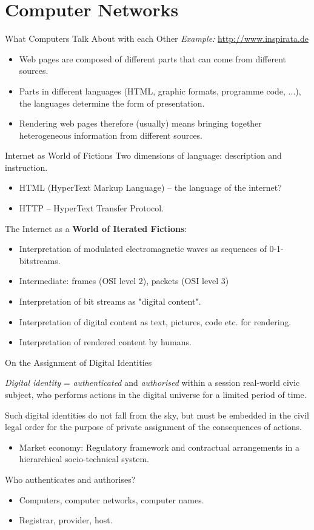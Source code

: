 \documentclass{beamer}
\begin{document}
\section{Computer Networks}
\begin{frame}{What Computers Talk About with each Other}
\emph{Example:} \url{http://www.inspirata.de} 
\begin{itemize}
\item Web pages are composed of different parts that can come from different
  sources.
\item Parts in different languages (HTML, graphic formats, programme code,
  ...), the languages determine the form of presentation.
\item Rendering web pages therefore (usually) means bringing together
  heterogeneous information from different sources.
\end{itemize}
\end{frame}
\begin{frame}{Internet as World of Fictions}
Two dimensions of language: description and instruction.
\begin{itemize}
\item HTML (HyperText Markup Language) -- the language of the internet? 
\item HTTP -- HyperText Transfer Protocol.
\end{itemize}
The Internet as a \textbf{World of Iterated Fictions}: 
\begin{itemize}
\item Interpretation of modulated electromagnetic waves as sequences of
  0-1-bitstreams. 
\item Intermediate: frames (OSI level 2), packets (OSI level 3)
\item Interpretation of bit streams as "digital content".
\item Interpretation of digital content as text, pictures, code etc. for
  rendering. 
\item Interpretation of rendered content by humans.
\end{itemize}
\end{frame}
\begin{frame}{On the Assignment of Digital Identities}

\emph{Digital identity} = \emph{authenticated} and \emph{authorised} within a
session real-world civic subject, who performs actions in the digital universe
for a limited period of time.

Such digital identities do not fall from the sky, but must be embedded in the
civil legal order for the purpose of private assignment of the consequences of
actions.
\begin{itemize}
\item Market economy: Regulatory framework and contractual arrangements in a
  hierarchical socio-technical system.
\end{itemize}
Who authenticates and authorises? 
\begin{itemize}
\item Computers, computer networks, computer names.
\item Registrar, provider, host.
\end{itemize}
\end{frame}
\end{document}
